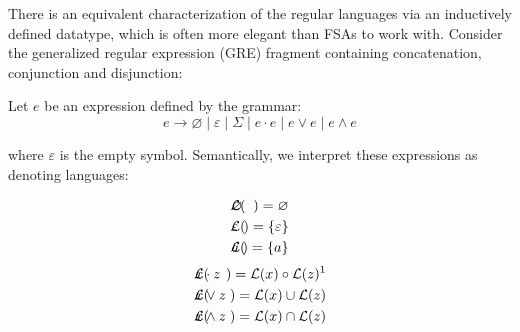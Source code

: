 \documentclass[sigplan,review,acmsmall,nonacm,screen,anonymous]{acmart}\settopmatter{printfolios=false,printccs=false,printacmref=false}
\begin{document}
There is an equivalent characterization of the regular languages via an inductively defined datatype, which is often more elegant than FSAs to work with. Consider the generalized regular expression (GRE) fragment containing concatenation, conjunction and disjunction:

\begin{definition}
  Let \( e \) be an expression defined by the grammar:
  \[
    e \rightarrow \varnothing \mid \varepsilon \mid \Sigma \mid e \cdot e \mid e \lor e \mid e \land e
  \]

where $\varepsilon$ is the empty symbol. Semantically, we interpret these expressions as denoting languages:\vspace{-0.8cm}

  \setlength{\columnseprule}{0pt}
  \setlength{\columnsep}{-3cm}
  \begin{multicols}{2}
    \begin{eqnarray*}
      \mathcal{L}(&\hspace{-0.35cm} \varnothing \hspace{-0.35cm}&) = \varnothing \\
      \mathcal{L}(&\hspace{-0.35cm} \varepsilon \hspace{-0.35cm}&) = \{\varepsilon\} \\
      \mathcal{L}(&\hspace{-0.35cm} a           \hspace{-0.35cm}&) = \{a\}
    \end{eqnarray*} \break\vspace{-0.45cm}
    \begin{eqnarray*}
      \mathcal{L}(&\hspace{-0.35cm} x\cdot z \hspace{-0.35cm}&) = \mathcal{L}(x) \circ \mathcal{L}(z)\text{\footnotemark}\\
      \mathcal{L}(&\hspace{-0.35cm} x\vee  z \hspace{-0.35cm}&) = \mathcal{L}(x) \cup  \mathcal{L}(z)\\
      \mathcal{L}(&\hspace{-0.35cm} x\land z \hspace{-0.35cm}&) = \mathcal{L}(x) \cap  \mathcal{L}(z)
    \end{eqnarray*}
  \end{multicols}
\end{definition}\vspace{-0.2cm}
\end{document}
